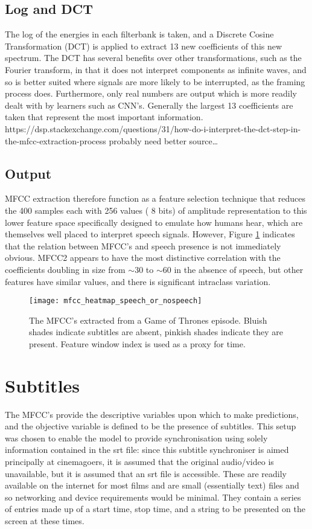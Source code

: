 \subsection{Log and DCT}
The log of the energies in each filterbank is taken, and a Discrete Cosine Transformation (DCT) is applied to extract 13 new coefficients of this new spectrum. The DCT has several benefits over other transformations, such as the Fourier transform, in that it does not interpret components as infinite waves, and so is better suited where signals are more likely to be interrupted, as the framing process does. Furthermore, only real numbers are output which is more readily dealt with by learners such as CNN’s. 
\newline
Generally the largest 13 coefficients are taken that represent the most important information.
https://dsp.stackexchange.com/questions/31/how-do-i-interpret-the-dct-step-in-the-mfcc-extraction-process 
probably need better source…

\subsection{Output}
MFCC extraction therefore function as a feature selection technique that reduces the 400 samples each with 256 values ( 8 bits) of amplitude representation to this lower feature space specifically designed to emulate how humans hear, which are themselves well placed to interpret speech signals. However, Figure \ref{mfccs_speech_orno} indicates that the relation between MFCC's and speech presence is not immediately obvious. MFCC2 appears to have the most distinctive correlation with the coefficients doubling in size from $\sim$30 to $\sim$60 in the absence of speech, but other features have similar values, and there is significant intraclass variation.

\begin{figure}[h]
	\texttt{[image: mfcc\_heatmap\_speech\_or\_nospeech]}
	\caption{The MFCC's extracted from a Game of Thrones episode. Bluish shades indicate subtitles are absent, pinkish shades indicate they are present. Feature window index is used as a proxy for time.}
	\label{mfccs_speech_orno}
\end{figure}

\section{Subtitles}
The MFCC’s provide the descriptive variables upon which to make predictions, and the objective variable is defined to be the presence of subtitles. This setup was chosen to enable the model to provide synchronisation using solely information contained in the srt file: since this subtitle synchroniser is aimed principally at cinemagoers, it is assumed that the original audio/video is unavailable, but it is assumed that an srt file is accessible. These are readily available on the internet for most films and are small (essentially text) files and so networking and device requirements would be minimal. They contain a series of entries made up of a start time, stop time, and a string to be presented on the screen at these times. 

